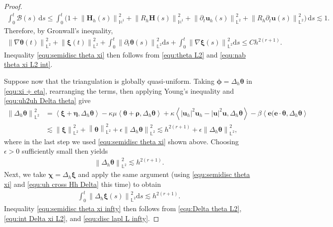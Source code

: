 \documentclass[11pt, reqno]{amsart}
\theoremstyle{definition}
\theoremstyle{remark}
\numberwithin{equation}{section}
\newcommand{\bff}{\boldsymbol}
\newcommand{\bb}{\mathbb}
\newcommand{\ds}{\mathrm{d}s}
\newcommand{\norm}[2]{\left\|{#1}\right\|_{#2}}
\newcommand{\inpro}[2]{\left\langle#1,#2\right\rangle}
\begin{document}
\begin{proof}
\begin{align*}
	\int_0^t \mathcal{B}(s)\, \ds
	\leq
	\int_0^t \big( 1 + \norm{\bff{H}_h(s)}{\bb{H}^1}^2 + \norm{R_h\bff{H}(s)}{\bb{H}^1}^2 
	+ \norm{\partial_t \bff{u}_h(s)}{\bb{L}^2}^2 + \norm{R_h\partial_t \bff{u}(s)}{\bb{L}^2}^2 \big)\, \ds
	\lesssim 1.
\end{align*}
Therefore, by Gronwall's inequality,
\begin{align}\label{equ:nab theta xi L2 int}
	\norm{\nabla \bff{\theta}(t)}{\bb{L}^2}^2
	+
	\norm{\bff{\xi}(t)}{\bb{L}^2}^2
	+
	\int_0^t \norm{\partial_t \bff{\theta}(s)}{\bb{L}^2}^2 \ds
	+
	\int_0^t \norm{\nabla \bff{\xi}(s)}{\bb{L}^2}^2 \ds
	\leq
	Ch^{2(r+1)}.
\end{align}
Inequality \eqref{equ:semidisc theta xi} then follows from \eqref{equ:theta L2} and \eqref{equ:nab theta xi L2 int}. 

Suppose now that the triangulation is globally quasi-uniform. Taking $\bff{\phi}= \Delta_h \bff{\theta}$ in \eqref{equ:xi + eta}, rearranging the terms, then applying Young's inequality and \eqref{equ:uh2uh Delta theta} give
\begin{align*}
	\norm{\Delta_h \bff{\theta}}{\bb{L}^2}^2
	&=
	\inpro{\bff{\xi}+\bff{\eta}}{\Delta_h \bff{\theta}}
	-
	\kappa \mu\inpro{\bff{\theta}+\bff{\rho}}{\Delta_h \bff{\theta}}
	+
	\kappa \inpro{|\bff{u}_h|^2 \bff{u}_h - |\bff{u}|^2 \bff{u}}{\Delta_h \bff{\theta}}
	-
	\beta \inpro{\bff{e}(\bff{e}\cdot\bff{\theta}}{\Delta_h \bff{\theta}}
	\\
	&\lesssim
	\norm{\bff{\xi}}{\bb{L}^2}^2 +\norm{\bff{\theta}}{\bb{L}^2}^2
	+ \epsilon \norm{\Delta_h \bff{\theta}}{\bb{L}^2}^2
	\lesssim
	h^{2(r+1)} + \epsilon \norm{\Delta_h \bff{\theta}}{\bb{L}^2}^2,
\end{align*}
where in the last step we used \eqref{equ:semidisc theta xi} shown above. Choosing $\epsilon>0$ sufficiently small then yields
\begin{align}\label{equ:Delta theta L2}
	\norm{\Delta_h \bff{\theta}}{\bb{L}^2}^2 \lesssim h^{2(r+1)}.
\end{align}
Next, we take $\bff{\chi}=\Delta_h \bff{\xi}$ and apply the same argument (using \eqref{equ:semidisc theta xi} and \eqref{equ:uh cross Hh Delta} this time) to obtain
\begin{align}\label{equ:int Delta xi L2}
	\int_0^t \norm{\Delta_h \bff{\xi}(s)}{\bb{L}^2}^2 \ds \lesssim h^{2(r+1)}.
\end{align}
Inequality \eqref{equ:semidisc theta xi infty} then follows from \eqref{equ:Delta theta L2}, \eqref{equ:int Delta xi L2}, and \eqref{equ:disc lapl L infty}.


\end{proof}
\end{document}
